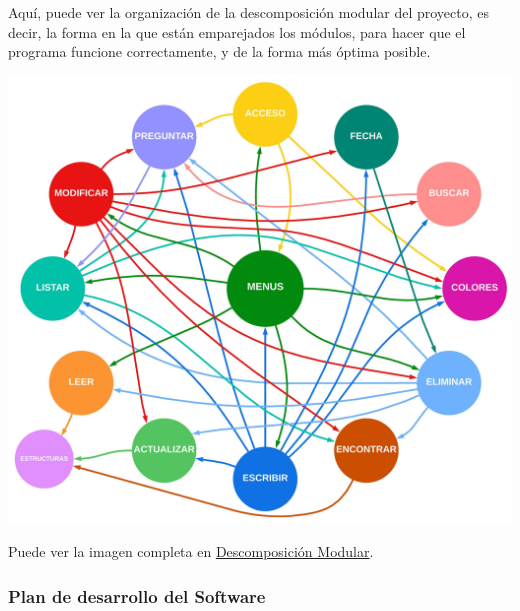 Aquí, puede ver la organización de la descomposición modular del proyecto, es decir, la forma en la que están emparejados los módulos,
para hacer que el programa funcione correctamente, y de la forma más óptima posible.\\
\begin{center}
  \includegraphics[width=1.1\textwidth]{FOTOS/Descomposicion_Modular.jpeg}
\end{center}

Puede ver la imagen completa en \href{FOTOS/Descomposicion_Modular.jpeg}{Descomposición Modular}.\\

\subsubsection{Plan de desarrollo del Software}

\bigskip

